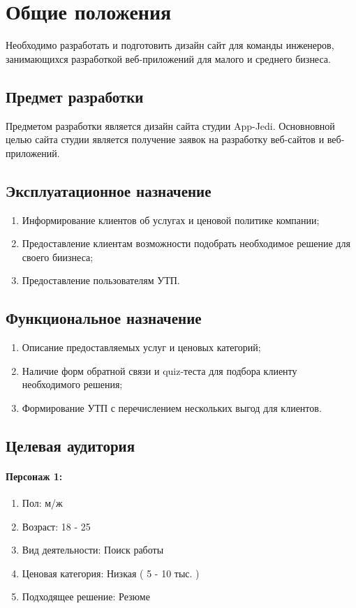 \section{Общие положения}
  Необходимо разработать и подготовить дизайн сайт для команды инженеров, занимающихся разработкой веб-приложений для малого и среднего бизнеса.

\subsection{Предмет разработки}
  Предметом разработки является дизайн сайта студии App-Jedi. Основновной целью сайта студии является получение заявок на разработку веб-сайтов и веб-приложений.

\subsection{Эксплуатационное назначение}
  \begin{enumerate}
    \item Информирование клиентов об услугах и ценовой политике компании;
    \item Предоставление клиентам возможности подобрать необходимое решение для своего биизнеса;
    \item Предоставление пользователям УТП.
  \end{enumerate}

\subsection{Функциональное назначение}
  \begin{enumerate}
    \item Описание предоставляемых услуг и ценовых категорий;
    \item Наличие форм обратной связи и quiz-теста для подбора клиенту необходимого решения;
    \item Формирование УТП с перечислением нескольких выгод для клиентов.
  \end{enumerate}

\subsection{Целевая аудитория}
\paragraph{Персонаж 1:}
\begin{enumerate}
  \item Пол: м/ж
  \item Возраст: 18 - 25
  \item Вид деятельности: Поиск работы
  \item Ценовая категория: Низкая ( 5 - 10 тыс. )
  \item Подходящее решение: Резюме
\end{enumerate}

